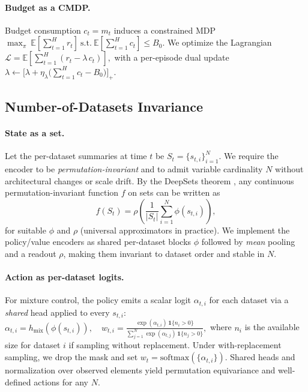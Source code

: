 \documentclass[11pt]{article}
\newcommand{\E}{\mathbb{E}}
\newcommand{\1}{\mathbf{1}}
\begin{document}
\paragraph{Budget as a CMDP.}
Budget consumption $c_t=m_t$ induces a constrained MDP
\(
\max_\pi \ \E[\sum_{t=1}^H r_t]\ \text{s.t.}\ \E[\sum_{t=1}^H c_t]\le B_0.
\)
We optimize the Lagrangian
\(
\mathcal{L}=\E\!\left[\sum_{t=1}^H (r_t-\lambda\,c_t)\right],
\)
with a per-episode dual update
\(
\lambda \leftarrow \big[\lambda + \eta_\lambda\big(\sum_{t=1}^H c_t - B_0\big)\big]_+.
\)

\subsection{Number-of-Datasets Invariance}\label{sec:invariance}
\paragraph{State as a set.}
Let the per-dataset summaries at time $t$ be $S_t=\{s_{t,i}\}_{i=1}^N$.
We require the encoder to be \emph{permutation-invariant} and to admit variable cardinality $N$ without architectural changes or scale drift.
By the DeepSets theorem \citep{zaheer2017deepsets}, any continuous permutation-invariant function $f$ on sets can be written as
\begin{equation}
f(S_t)=\rho\!\left(\frac{1}{|S_t|}\sum_{i=1}^N \phi(s_{t,i})\right),
\label{eq:deepsets}
\end{equation}
for suitable $\phi$ and $\rho$ (universal approximators in practice).
We implement the policy/value encoders as shared per-dataset blocks $\phi$ followed by \emph{mean} pooling and a readout $\rho$, making them invariant to dataset order and stable in $N$.

\paragraph{Action as per-dataset logits.}
For mixture control, the policy emits a scalar logit $\alpha_{t,i}$ for each dataset via a \emph{shared} head applied to every $s_{t,i}$:
\(
\alpha_{t,i} = h_{\text{mix}}(\phi(s_{t,i})),\quad
w_{t,i}=\frac{\exp(\alpha_{t,i})\,\1\{n_i>0\}}{\sum_{j=1}^N \exp(\alpha_{t,j})\,\1\{n_j>0\}},
\)
where $n_i$ is the available size for dataset $i$ if sampling without replacement. Under with-replacement sampling,
we drop the mask and set $w_t=\mathrm{softmax}(\{\alpha_{t,i}\})$. Shared heads and normalization over observed elements yield permutation equivariance and well-defined actions for any $N$.
\end{document}
